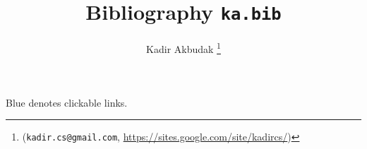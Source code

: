 \documentclass[12pt]{article}
\title{Bibliography \texttt{ka.bib}}
\author{Kadir Akbudak%
        \thanks{%
                (\texttt{kadir.cs@gmail.com},
                \url{https://sites.google.com/site/kadircs/})
               }
}
\begin{document}
\maketitle
Blue denotes clickable links.


\nocite{*}

% 

% 

\end{document}
